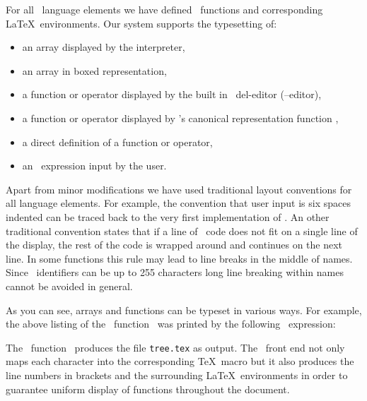 For all \APL\ language elements we have defined \APL\ functions
and corresponding \LaTeX\ environments. 
Our system supports
the typesetting of:
\begin{itemize}\dense
\item an array displayed by the interpreter,
\item an array in boxed representation,
\item a function or operator displayed by the built in
      \APL\ del-editor (\APLdel--editor),
\item a function or operator displayed by \APL's canonical
      representation function {\APLquad\APLC\APLR},
\item a direct definition of a function or operator,
\item an \APL\ expression input by the user.
\end{itemize}
Apart from minor modifications we have used traditional layout
conventions for all language elements.
For example, the convention that user input is six
spaces indented can be traced back to the very first implementation of
\APL. An other traditional convention states that if a line of \APL\
code does not fit on a single line of the display, the rest of the code
is wrapped around and continues on the next line.  In some functions
this rule may lead to line breaks in the
middle of names. Since \APL\ identifiers can be up to 255 characters
long line breaking within names cannot be avoided in general. 

As you can see, arrays and functions can be typeset in various ways.
For example, the above listing of the \APL\ function
\APLdelta\APLT\APLR\APLE\APLE\
was printed by the following \APL\ expression:
 
{\parsep=0pt %
\begin{APLbold}\begin{APLexpr}
\APLquote\APLT\APLR\APLE\APLE\APLquote\APLspace\APLP\APLR
\APLT\APLE\APLX\protect\APLunderbar\APLF\APLN\APLspace
\APLquote\protect\APLdelta\APLT\APLR\APLE
\APLE\APLquote
\end{APLexpr}\end{APLbold}
}           %
 
The \APL\ function \APLP\APLR\APLT\APLE\APLX\APLunderbar\APLF\APLN\
produces the file {\tt tree.tex} as output.
The \APL\ front end not only maps each
character into the corresponding \TeX\ macro but it also produces
the line numbers in brackets and the surrounding \LaTeX\ environments
in order to guarantee uniform display of functions throughout the document.
 
